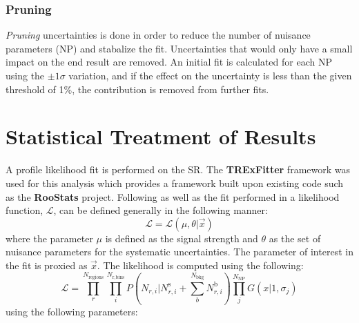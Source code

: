 \subsubsection{Pruning}
\label{sec:Pruning}
\textit{Pruning} uncertainties is done in order to reduce the number of nuisance parameters (NP) and stabalize the fit.  Uncertainties that would only have a small impact on the end result are removed.  An initial fit is calculated for each NP using the $\pm 1 \sigma$ variation, and if the effect on the uncertainty is less than the given threshold of 1\%, the contribution is removed from further fits. %

\section{Statistical Treatment of Results}
\label{sec:StatTreatment}
A profile likelihood fit is performed on the SR.  The \textbf{TRExFitter} framework \cite{TRExFitter} was used for this analysis which provides a framework built upon existing code such as the \textbf{RooStats} project\cite{Moneta:2010pm}.
Following \cite{Lista:2016chp} as well as the fit performed in \cite{GregorFCNC} a likelihood function, $\mathcal{L}$, can be defined generally in the following manner:
\[ \mathcal{L} = \mathcal{L}(\mu,\theta|\overrightarrow{x})
\]
where the parameter $\mu$ is defined as the signal strength and $\theta$ as the set of nuisance parameters for the systematic uncertainties.  The parameter of interest in the fit is proxied as  $\overrightarrow{x}$.  The likelihood is computed using the following:
\[ \mathcal{L} = \displaystyle\prod_{r}^{N_\text{regions}}  \displaystyle\prod_{i}^{N_\text{r,bins}} P(N_{r,i}|N_{r,i}^\text{s} + \displaystyle\sum_{b}^{N_\text{bkg}}N_{r,i}^\text{b}) \displaystyle\prod_{j}^{N_\text{NP}} G(x|1,\sigma_{j})
\]
using the following parameters:

